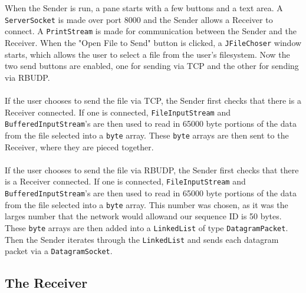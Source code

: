 \documentclass[13pt]{article}
\begin{document}
When the Sender is run, a pane starts with a few buttons and a text area.
A \texttt{ServerSocket} is made over port 8000 and the Sender allows a Receiver to connect.
A \texttt{PrintStream} is made for communication between the Sender and the Receiver.
When the "Open File to Send" button is clicked, a \texttt{JFileChoser} window starts, which
allows the user to select a file from the user's filesystem. Now the two send
buttons are enabled, one for sending via TCP and the other for sending via RBUDP.
\\\\
If the user chooses to send the file via TCP, the Sender first checks that there
is a Receiver connected. If one is connected, \texttt{FileInputStream} and
 \texttt{BufferedInputStream}'s are then used to read in 65000 byte portions of the
data from the file selected into a \texttt{byte} array. These \texttt{byte} arrays
are then sent to the Receiver, where they are pieced together.
\\\\
If the user chooses to send the file via RBUDP, the Sender first checks that there
is a Receiver connected. If one is connected, \texttt{FileInputStream} and
 \texttt{BufferedInputStream}'s are then used to read in 65000 byte portions of the
data from the file selected into a \texttt{byte} array. This number was chosen, as
it was the larges number that the network would allowand our sequence ID is 50 bytes.
These \texttt{byte} arrays are then added into a \texttt{LinkedList} of type
\texttt{DatagramPacket}. Then the Sender iterates through the \texttt{LinkedList}
and sends each datagram packet via a \texttt{DatagramSocket}.

\subsection{The Receiver}
\end{document}
